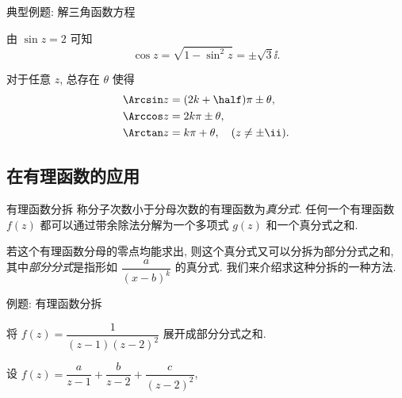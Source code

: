 \begin{frame}{典型例题: 解三角函数方程}
	\onslide<+->
	\begin{solution}[][另解]
	由 $\sin z=2$ 可知
	\[
		\cos z=\sqrt{1-\sin^2 z}=\pm\sqrt 3\ii.
	\]
	\onslide<+->{%
		\[
			z=-\ii \Ln\bigl((2\pm\sqrt 3)\ii\bigr)
			=\Bigl(2k+\half\Bigr)\pi\pm \ii\ln(2+\sqrt3),\quad k\in\BZ.
		\]
	}\bigdel
	\end{solution}
	\onslide<+->
	对于任意 $z$, 总存在 $\theta$ 使得
	\begin{align*}
		\Arcsin z&=(2k+\half)\pi\pm \theta,\\
		\Arccos z&=2k\pi\pm \theta,\\
		\Arctan z&=k\pi+\theta,\quad (z\ne\pm\ii).
	\end{align*}
\end{frame}


\subsection{在有理函数的应用}


\begin{frame}{有理函数分拆}
	\onslide<+->
	称分子次数小于分母次数的有理函数为\emph{真分式}.
	\onslide<+->
	任何一个有理函数 $f(z)$ 都可以通过带余除法分解为一个多项式 $g(z)$ 和一个真分式之和.

	\onslide<+->
	若这个有理函数分母的零点均能求出, 则这个真分式又可以分拆为部分分式之和, 其中\emph{部分分式}是指形如 $\dfrac{a}{(x-b)^k}$ 的真分式.
	\onslide<+->
	我们来介绍求这种分拆的一种方法.
\end{frame}


\begin{frame}{例题: 有理函数分拆}
	\beqskip{2pt}
	\onslide<+->
	\begin{example}[near]
		将 $f(z)=\dfrac{1}{(z-1)(z-2)^2}$ 展开成部分分式之和.
	\end{example}
	\onslide<+->
	\begin{solution}[near]
		设 $f(z)=\dfrac{a}{z-1}+\dfrac{b}{z-2}+\dfrac{c}{(z-2)^2}$,
		\bigdel
	\end{solution}
	\endgroup
\end{frame}


